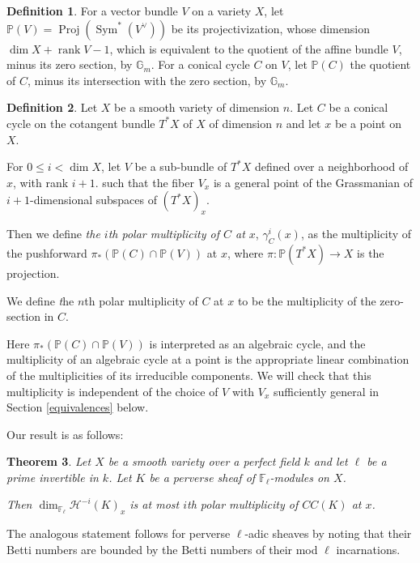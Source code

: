 \documentclass[12pt]{amsart}
\newtheorem{theorem}{Theorem}[section]
\theoremstyle{definition}
\newtheorem{defi}[theorem]{Definition}
\theoremstyle{remark}
\begin{document}
\begin{defi} For a vector bundle $V$ on a variety $X$, let $\mathbb P(V) = \operatorname{Proj} (\operatorname{Sym}^* (V^\vee ))$ be its projectivization, whose dimension $\dim X + \operatorname{rank} V-1$, which is equivalent to the quotient of the affine bundle $V$, minus its zero section, by $\mathbb G_m$. For a conical cycle $C$ on $V$, let $\mathbb P(C)$ the quotient of $C$, minus its intersection with the zero section, by $\mathbb G_m$. \end{defi} 

\begin{defi}\label{polar-multiplicity} Let $X$ be a smooth variety of dimension $n$. Let $C$ be a conical cycle on the cotangent bundle $T^* X$ of $X$ of dimension $n$ and let $x$ be a point on $X$.

For $0 \leq i< \dim X$, let $V$ be a sub-bundle of $T^* X$ defined over a neighborhood of $x$, with rank $i+1$. such that the fiber $V_x$ is a general point of the Grassmanian of $i+1$-dimensional subspaces of $(T^* X)_x$. 

Then we define \emph{the $i$th polar multiplicity of $C$ at $x$},  $\gamma^i_C(x)$, as the multiplicity of the pushforward $\pi_* ( \mathbb P(C) \cap \mathbb P(V))$ at $x$, where $\pi: \mathbb P( T^* X) \to X$ is the projection. 

We define {\emph the $n$th polar multiplicity of $C$ at $x$} to be the multiplicity of the zero-section in $C$. \end{defi}

Here $\pi_*( \mathbb P(C) \cap \mathbb P(V))$ is interpreted as an algebraic cycle, and the multiplicity of an algebraic cycle at a point is the appropriate linear combination of the multiplicities of its irreducible components. We will check that this multiplicity is independent of the choice of $V$ with $V_x$ sufficiently general in Section \ref{equivalences} below.

Our result is as follows:

\begin{theorem}\label{first-Massey-intro} Let $X$ be a smooth variety over a perfect field $k$ and let $\ell$ be a prime invertible in $k$. Let $K$ be a perverse sheaf of $\mathbb F_\ell$-modules on $X$. 

Then $\dim_{\mathbb F_\ell} \mathcal H^{-i}(K)_x$ is at most $i$th polar multiplicity of $CC(K)$ at $x$. \end{theorem}

The analogous statement follows for perverse $\ell$-adic sheaves by noting that their Betti numbers are bounded by the Betti numbers of their mod $\ell$ incarnations.
\end{document}
